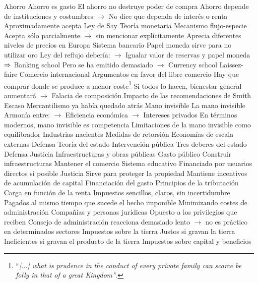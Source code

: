 \documentclass{nuevotema}
\begin{document}
\begin{esquemal}
			\3 Ahorro
				\4 Ahorro es gasto
				\4[] El ahorro no destruye poder de compra
				\4 Ahorro depende de instituciones y costumbres
				\4[] $\to$ No dice que dependa de interés o renta
				\4 Aproximadamente acepta Ley de Say
		\2 Teoría monetaria
			\3 Mecanismo flujo-especie
				\4 Acepta sólo parcialmente
				\4[] $\to$ sin mencionar explícitamente
				\4 Aprecia diferentes niveles de precios en Europa
			\3 Sistema bancario
				\4 Papel moneda sirve para no utilizar oro
				\4 Ley del reflujo debería:
				\4[] $\to$ Igualar valor de reservas y papel moneda
				\4[] $\Rightarrow$ Banking school
				\4 Pero se ha emitido demasiado
				\4[] $\to$ Currency school
		\2 Laissez-faire
			\3 Comercio internacional
				\4 Argumentos en favor del libre comercio
				\4[] Hay que comprar donde se produce a menor coste\footnote{``\textit{[...] what is prudence in the conduct of every private family can scarce be folly in that of a great Kingdom''}.}
				\4[] Si todos lo hacen, bienestar general aumentará
				\4[] $\to$ Falacia de composición
				\4 Impacto de las recomendaciones de Smith
				\4[] Escaso
				\4[] Mercantilismo ya había quedado atrás
			\3 Mano invisible
				\4 La mano invisible
				\4[] Armonía entre:
				\4[] $\to$ Eficiencia económica
				\4[] $\to$ Intereses privados
				\4[] En términos modernos, mano invisible es competencia
				\4 Limitaciones de la mano invisible como equilibrador
				\4[] Industrias nacientes
				\4[] Medidas de retorsión
				\4[] Economías de escala externas
				\4[] Defensa
		\2 Teoría del estado
			\3 Intervención pública
				\4 Tres deberes del estado
				\4[] Defensa
				\4[] Justicia
				\4[] Infraestructuras y obras públicas
				\4 Gasto público
				\4[] Construir infraestructuras
				\4[] Mantener el comercio
				\4[] Sistema educativo
				\4[] Financiado por usuarios directos si posible
				\4 Justicia
				\4[] Sirve para proteger la propiedad
				\4[] Mantiene incentivos de acumulación de capital
			\3 Financiación del gasto
				\4 Principios de la tributación
				\4[(i)] Carga en función de la renta
				\4[(ii)] Impuestos sencillos, claros, sin incertidumbre
				\4[(iii)] Pagados al mismo tiempo que sucede el hecho imponible
				\4[(iv)] Minimizando costes de administración
				\4 Compañías y personas jurídicas
				\4[] Opuesto a los privilegios que reciben
				\4[] Consejo de administración reacciona demasiado lento
				\4[] $\to$ no es práctico en determinados sectores
				\4 Impuestos sobre la tierra
				\4[] Justos si gravan la tierra
				\4[] Ineficientes si gravan el producto de la tierra
				\4 Impuestos sobre capital y beneficios

\end{esquemal}
\end{document}
